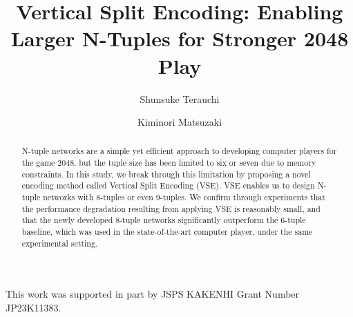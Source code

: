 \documentclass[runningheads]{llncs}
\begin{document}
%
\title{Vertical Split Encoding: Enabling Larger N-Tuples for Stronger 2048 Play}
%
%
\author{Shunsuke Terauchi \and %
Kiminori Matsuzaki}
%
%
%
\maketitle              %
%
\begin{abstract}
N-tuple networks are a simple yet efficient approach to developing computer players for the game 2048,
but the tuple size has been limited to six or seven due to memory constraints.
In this study, we break through this limitation by proposing a novel encoding method called Vertical Split Encoding (VSE).  VSE enables us to design N-tuple networks with 8-tuples or even 9-tuples.
We confirm through experiments that the performance degradation resulting from applying VSE is reasonably small, and that the newly developed 8-tuple networks significantly outperform the 6-tuple baseline, which was used in the state-of-the-art computer player, under the same experimental setting.

\end{abstract}
%
%
%






% 


\subsubsection{\ackname} This work was supported in part by JSPS KAKENHI Grant Number JP23K11383.

% 
% 

\end{document}
